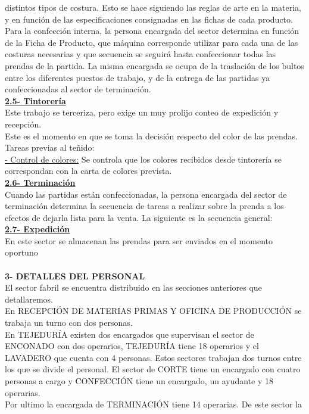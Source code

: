 \documentclass[a4paper,10pt,titlepage]{article}
\begin{document}
distintos tipos de costura. Esto se hace siguiendo las reglas de arte en la materia, y
en función de las especificaciones consignadas en las fichas de cada producto.
Para la confección interna, la persona encargada del sector determina en función
de la Ficha de Producto, que máquina corresponde utilizar para cada una de las
costuras necesarias y que secuencia se seguirá hasta confeccionar todas las
prendas de la partida. La misma encargada se ocupa de la traslación de los bultos
entre los diferentes puestos de trabajo, y de la entrega de las partidas ya
confeccionadas al sector de terminación.\\
\textbf{\underline{2.5- Tintorería}}\\
Este trabajo se terceriza, pero exige un muy prolijo conteo de expedición y
recepción.\\
Este es el momento en que se toma la decisión respecto del color de las prendas.\\
Tareas previas al teñido:\\
\underline{ - Control de colores:} Se controla que los colores recibidos desde tintorería se
correspondan con la carta de colores prevista.\\
\textbf{\underline{2.6- Terminación}}\\
Cuando las partidas están confeccionadas, la persona encargada del sector de
terminación determina la secuencia de tareas a realizar sobre la prenda a los
efectos de dejarla lista para la venta. La siguiente es la secuencia general:\\
\textbf{\underline{2.7- Expedición}}\\
En este sector se almacenan las prendas para ser enviados en el momento
oportuno\\ \\
\textbf{3- DETALLES DEL PERSONAL}\\
El sector fabril se encuentra distribuido en las secciones anteriores que
detallaremos.\\
En RECEPCIÓN DE MATERIAS PRIMAS Y OFICINA DE PRODUCCIÓN se
trabaja un turno con dos personas.\\
En TEJEDURÍA existen dos encargados que supervisan el sector de ENCONADO
con dos operarios, TEJEDURÍA tiene 18 operarios y el LAVADERO que cuenta con
4 personas. Estos sectores trabajan dos turnos entre los que se divide el personal.
El sector de CORTE tiene un encargado con cuatro personas a cargo y
CONFECCIÓN tiene un encargado, un ayudante y 18 operarias.\\
Por ultimo la encargada de TERMINACIÓN tiene 14 operarias. De este sector la
\end{document}
